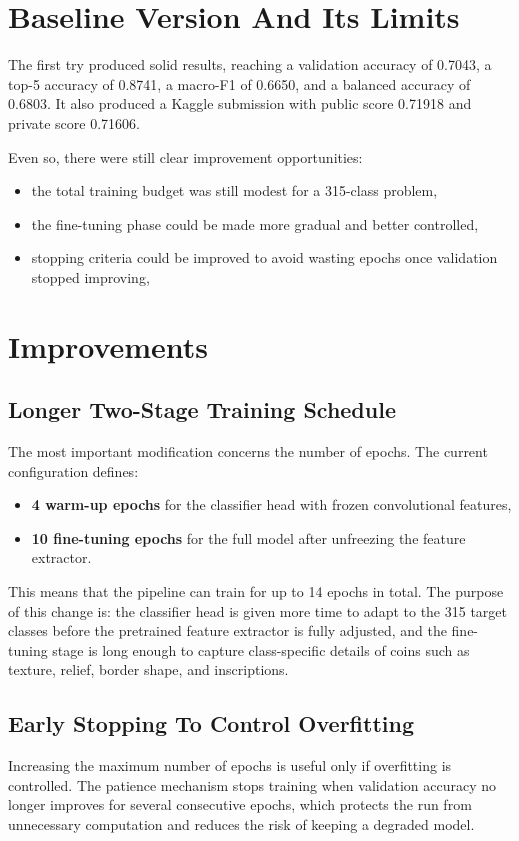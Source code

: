 \documentclass[11pt,a4paper]{article}
\begin{document}
\section{Baseline Version And Its Limits}
The first try produced solid results, reaching a validation accuracy of 0.7043, a top-5 accuracy of 0.8741, a macro-F1 of 0.6650, and a balanced accuracy of 0.6803. It also produced a Kaggle submission with public score 0.71918 and private score 0.71606.

Even so, there were still clear improvement opportunities:
\begin{itemize}[leftmargin=1.4em]
    \item the total training budget was still modest for a 315-class problem,
    \item the fine-tuning phase could be made more gradual and better controlled,
    \item stopping criteria could be improved to avoid wasting epochs once validation stopped improving,
\end{itemize}

\section{Improvements}

\subsection{Longer Two-Stage Training Schedule}
The most important modification concerns the number of epochs. The current configuration defines:
\begin{itemize}[leftmargin=1.4em]
    \item \textbf{4 warm-up epochs} for the classifier head with frozen convolutional features,
    \item \textbf{10 fine-tuning epochs} for the full model after unfreezing the feature extractor.
\end{itemize}

This means that the pipeline can train for up to 14 epochs in total. The purpose of this change is: the classifier head is given more time to adapt to the 315 target classes before the pretrained feature extractor is fully adjusted, and the fine-tuning stage is long enough to capture class-specific details of coins such as texture, relief, border shape, and inscriptions.

\subsection{Early Stopping To Control Overfitting}
Increasing the maximum number of epochs is useful only if overfitting is controlled. The patience mechanism stops training when validation accuracy no longer improves for several consecutive epochs, which protects the run from unnecessary computation and reduces the risk of keeping a degraded model.
\end{document}
